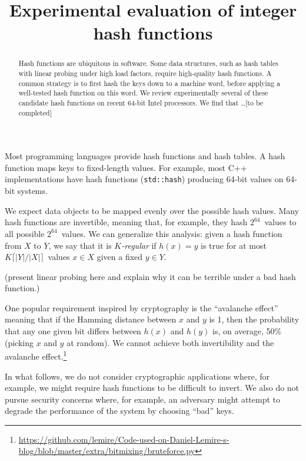 \documentclass{article}
\title{Experimental evaluation of integer hash functions}
\author{}
\begin{document}
\maketitle

\begin{abstract}
Hash functions are ubiquitous in software. Some data structures, such as hash tables with linear probing under high load factors, require high-quality hash functions. A common strategy is to first hash the keys down to a machine word, before applying a well-tested hash function on this word. We review experimentally several of these candidate hash functions on recent 64-bit Intel processors. We find that \ldots [to be completed]
\end{abstract}
\lstset{escapechar=@,style=customc}


Most programming languages provide hash functions and hash tables. A hash function maps keys to fixed-length values. For example, most C++ implementations have hash functions (\texttt{std::hash}) producing 64-bit values on 64-bit systems.

We expect data objects to be mapped
evenly over the possible hash values. 
Many hash functions are invertible, meaning that, for example, they hash  $2^{64}$~values to all possible $2^{64}$~values. We can generalize this analysis: given a hash function from $X$ to $Y$, we say that it is \emph{$K$-regular} if $h(x) = y$ is true for at most $K \lceil |Y| / |X| \rceil $~values $x\in X$ given a fixed $y\in Y$.

(present linear probing here and explain why it can be terrible under a bad hash function.)

One popular requirement inspired by cryptography is the ``avalanche effect'' meaning that if the Hamming distance between $x$ and $y$ is 1, then the probability that any one given bit differs between  $h(x)$ and $h(y)$ is, on average, 50\% (picking $x$ and $y$ at random). We cannot achieve both invertibility and the avalanche effect.\footnote{\url{https://github.com/lemire/Code-used-on-Daniel-Lemire-s-blog/blob/master/extra/bitmixing/bruteforce.py}}

In what follows, we do not consider cryptographic applications where, for example, we might require hash functions to be difficult to invert. We also do not pursue security concerns where, for example, an adversary might attempt to degrade the performance of the system by choosing ``bad'' keys. 
\end{document}
